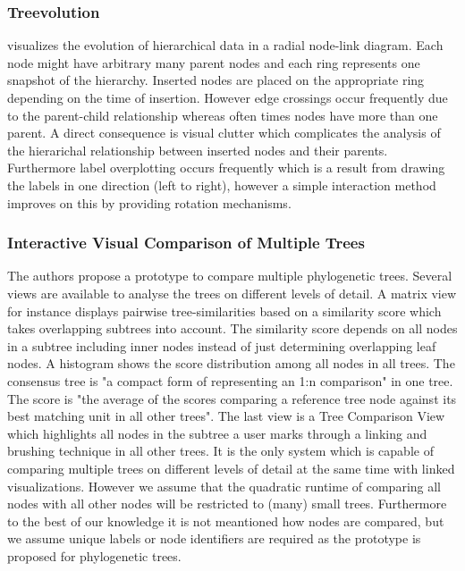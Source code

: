 \subsubsection{Treevolution\cite{theron2006hierarchical}} visualizes the evolution of hierarchical data in a radial node-link diagram. Each node might have arbitrary many parent nodes and each ring represents one snapshot of the hierarchy. Inserted nodes are placed on the appropriate ring depending on the time of insertion. However edge crossings occur frequently due to the parent-child relationship whereas often times nodes have more than one parent. A direct consequence is visual clutter which complicates the analysis of the hierarichal relationship between inserted nodes and their parents. Furthermore label overplotting occurs frequently which is a result from drawing the labels in one direction (left to right), however a simple interaction method improves on this by providing rotation mechanisms.

\subsubsection{Interactive Visual Comparison of Multiple Trees\cite{bremm2011interactive}} The authors propose a prototype to compare multiple phylogenetic trees. Several views are available to analyse the trees on different levels of detail. A matrix view for instance displays pairwise tree-similarities based on a similarity score which takes overlapping subtrees into account. The similarity score depends on all nodes in a subtree including inner nodes instead of just determining overlapping leaf nodes. A histogram shows the score distribution among all nodes in all trees. The consensus tree is "a compact form of representing an 1:n comparison" in one tree. The score is "the average of the scores comparing a reference tree node against its best matching unit in all other trees". The last view is a Tree Comparison View which highlights all nodes in the subtree a user marks through a linking and brushing technique in all other trees. It is the only system which is capable of comparing multiple trees on different levels of detail at the same time with linked visualizations. However we assume that the quadratic runtime of comparing all nodes with all other nodes will be restricted to (many) small trees. Furthermore to the best of our knowledge it is not meantioned how nodes are compared, but we assume unique labels or node identifiers are required as the prototype is proposed for phylogenetic trees. 

